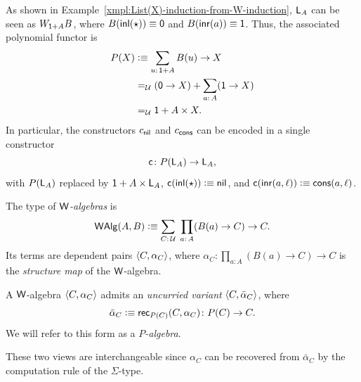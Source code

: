 \begin{xmpl}\label{xmpl:P(L_A)}
    As shown in Example~\ref{xmpl:List(X)-induction-from-W-induction}, $\mathsf{L}_A$ can be seen as $W_{\mathsf{1}+A}B$, where $B(\mathsf{inl}({\mathsf{\star}}))\equiv\mathsf{0}$ and $B(\mathsf{inr}(a))\equiv\mathsf{1}$. Thus, the associated polynomial functor is
    \begin{align*}
        P(X)&\defeq\sum_{u\colon\fun1+A}B(u)\to X\\
            &\eq{\univ}(\fun0\to X)+\sum_{a\colon A}(\fun1\to X)\\
            &\eq{\univ}\fun1+A\times X.
    \end{align*}
    In particular, the constructors $c_{\mathsf{nil}}$ and $c_{\mathsf{cons}}$ can be encoded in a single constructor
    \[
        \fun c\colon P(\fun L_A)\to\fun L_A,
    \]
    with $P(\mathsf{L}_A)$ replaced by $\mathsf{1}+A\times\mathsf{L}_A$, $\mathsf{c}(\mathsf{inl}({\mathsf{\star}}))\mathrel{\vcentcolon}\equiv\mathsf{nil}$, and $\mathsf{c}(\mathsf{inr}(a,\ell))\mathrel{\vcentcolon}\equiv\mathsf{cons}(a,\ell)$.
\end{xmpl}

\begin{defn} 
    The type of \textsl{$\mathsf{W}$-algebras} is
    \[
        \fun W\fun{Alg}(A,B)
            \defeq\sum_{C\colon\univ}\;
                \prod_{a\colon A}(B(a)\to C)\to C.
    \]
    Its terms are dependent pairs $\langle C,\alpha_C\rangle$, where $\alpha_C\colon\prod_{a\colon A}(B(a)\to C)\to C$ is the \textsl{structure map} of the $\mathsf{W}$-algebra.
\end{defn}

\begin{rem}
    A $\mathsf{W}$-algebra $\langle C,\alpha_C\rangle$ admits an \textsl{uncurried variant} $\langle C,\bar\alpha_C\rangle$, where
    \[
        \bar\alpha_C\defeq\fun{rec}_{P(C)}(C,\alpha_C)
            \colon P(C)\to C.
    \]
    We will refer to this form as a \textsl{$P$-algebra}.
    
    These two views are interchangeable since $\alpha_C$ can be recovered from $\bar\alpha_C$ by the computation rule of the $\Sigma$-type.
\end{rem}

